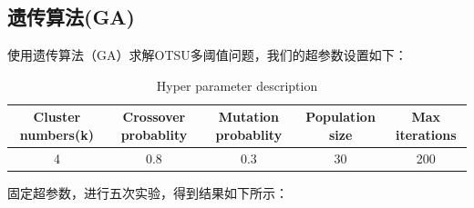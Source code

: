 \documentclass{article}
\begin{document}
\subsection{遗传算法(GA)}
使用遗传算法（GA）求解OTSU多阈值问题，我们的超参数设置如下：
\begin{table}[h]
	\centering
	\begin{tabular}{ccccc}
	  \hline
	  Cluster numbers(k) & Crossover probablity & Mutation probablity & Population size & Max iterations\\ \hline
	  4
	  & 0.8
	  & 0.3
	  & 30
	  & 200
	  \\ \hline
	\end{tabular}
	\caption{Hyper parameter description}
\end{table}

固定超参数，进行五次实验，得到结果如下所示：
\end{document}
